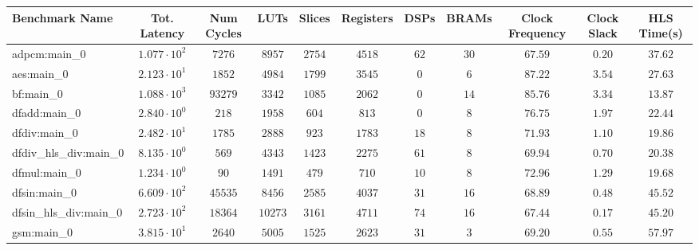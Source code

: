 \begin{tabular}{|l|c|c|c|c|c|c|c|c|c|c|}
\hline
Benchmark Name          & Tot. Latency           & Num Cycles & LUTs      & Slices    & Registers & DSPs    & BRAMs   & Clock Frequency & Clock Slack & HLS Time(s) \\
\hline
adpcm:main\_0           & $ 1.077 \cdot 10^{2} $ & $ 7276   $ & $ 8957  $ & $ 2754  $ & $ 4518  $ & $ 62  $ & $ 30  $ & $ 67.59       $ & $ 0.20    $ & $ 37.62   $ \\
aes:main\_0             & $ 2.123 \cdot 10^{1} $ & $ 1852   $ & $ 4984  $ & $ 1799  $ & $ 3545  $ & $ 0   $ & $ 6   $ & $ 87.22       $ & $ 3.54    $ & $ 27.63   $ \\
bf:main\_0              & $ 1.088 \cdot 10^{3} $ & $ 93279  $ & $ 3342  $ & $ 1085  $ & $ 2062  $ & $ 0   $ & $ 14  $ & $ 85.76       $ & $ 3.34    $ & $ 13.87   $ \\
dfadd:main\_0           & $ 2.840 \cdot 10^{0} $ & $ 218    $ & $ 1958  $ & $ 604   $ & $ 813   $ & $ 0   $ & $ 8   $ & $ 76.75       $ & $ 1.97    $ & $ 22.44   $ \\
dfdiv:main\_0           & $ 2.482 \cdot 10^{1} $ & $ 1785   $ & $ 2888  $ & $ 923   $ & $ 1783  $ & $ 18  $ & $ 8   $ & $ 71.93       $ & $ 1.10    $ & $ 19.86   $ \\
dfdiv\_hls\_div:main\_0 & $ 8.135 \cdot 10^{0} $ & $ 569    $ & $ 4343  $ & $ 1423  $ & $ 2275  $ & $ 61  $ & $ 8   $ & $ 69.94       $ & $ 0.70    $ & $ 20.38   $ \\
dfmul:main\_0           & $ 1.234 \cdot 10^{0} $ & $ 90     $ & $ 1491  $ & $ 479   $ & $ 710   $ & $ 10  $ & $ 8   $ & $ 72.96       $ & $ 1.29    $ & $ 19.68   $ \\
dfsin:main\_0           & $ 6.609 \cdot 10^{2} $ & $ 45535  $ & $ 8456  $ & $ 2585  $ & $ 4037  $ & $ 31  $ & $ 16  $ & $ 68.89       $ & $ 0.48    $ & $ 45.52   $ \\
dfsin\_hls\_div:main\_0 & $ 2.723 \cdot 10^{2} $ & $ 18364  $ & $ 10273 $ & $ 3161  $ & $ 4711  $ & $ 74  $ & $ 16  $ & $ 67.44       $ & $ 0.17    $ & $ 45.20   $ \\
gsm:main\_0             & $ 3.815 \cdot 10^{1} $ & $ 2640   $ & $ 5005  $ & $ 1525  $ & $ 2623  $ & $ 31  $ & $ 3   $ & $ 69.20       $ & $ 0.55    $ & $ 57.97   $ \\

\end{tabular}
